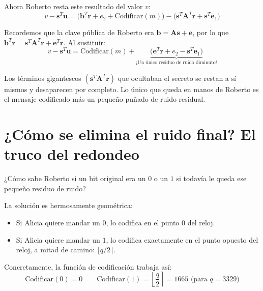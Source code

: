 Ahora Roberto resta este resultado del valor $v$:
\[
v - \mathbf{s}^T \mathbf{u} = \Big(\mathbf{b}^T \mathbf{r} + e_2 + \text{Codificar}(m)\Big) - \Big(\mathbf{s}^T \mathbf{A}^T \mathbf{r} + \mathbf{s}^T \mathbf{e}_1\Big)
\]

Recordemos que la clave pública de Roberto era $\mathbf{b} = \mathbf{As} + \mathbf{e}$, por lo que $\mathbf{b}^T \mathbf{r} = \mathbf{s}^T \mathbf{A}^T \mathbf{r} + \mathbf{e}^T \mathbf{r}$. Al sustituir:
\[
v - \mathbf{s}^T \mathbf{u} = \text{Codificar}(m) + \underbrace{\big(\mathbf{e}^T \mathbf{r} + e_2 - \mathbf{s}^T \mathbf{e}_1\big)}_{\text{¡Un único residuo de ruido diminuto!}}
\]

\begin{intuicion}
Los términos gigantescos $(\mathbf{s}^T \mathbf{A}^T \mathbf{r})$ que ocultaban el secreto se restan a sí mismos y desaparecen por completo. Lo único que queda en manos de Roberto es el mensaje codificado más un pequeño puñado de ruido residual.
\end{intuicion}

\section{¿Cómo se elimina el ruido final? El truco del redondeo}

¿Cómo sabe Roberto si un bit original era un $0$ o un $1$ si todavía le queda ese pequeño residuo de ruido?

La solución es hermosamente geométrica:
\begin{itemize}
  \item Si Alicia quiere mandar un $0$, lo codifica en el punto \textbf{$0$} del reloj.
  \item Si Alicia quiere mandar un $1$, lo codifica exactamente en el punto opuesto del reloj, a mitad de camino: \textbf{$\lfloor q/2 \rceil$}.
\end{itemize}

Concretamente, la función de codificación trabaja así:
\[
\text{Codificar}(0) = 0 \qquad \text{Codificar}(1) = \left\lfloor \frac{q}{2} \right\rceil = 1665 \text{ (para } q = 3329\text{)}
\]

